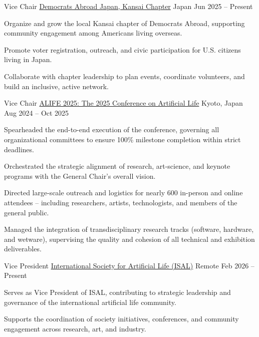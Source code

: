 
\begin{cventries}

\cventry
  {Vice Chair}
  {\href{https://www.democratsabroad.org/jp_kansai}{Democrats Abroad Japan, Kansai Chapter}}
  {Japan}
  {Jun 2025 -- Present}
  {
    \begin{cvitems}
      \item {Organize and grow the local Kansai chapter of Democrats Abroad, supporting community engagement among Americans living overseas.}
      \item {Promote voter registration, outreach, and civic participation for U.S. citizens living in Japan.}
      \item {Collaborate with chapter leadership to plan events, coordinate volunteers, and build an inclusive, active network.}
    \end{cvitems}
  }

\cventry
  {Vice Chair}
  {\href{https://2025.alife.org/}{ALIFE 2025: The 2025 Conference on Artificial Life}}
  {Kyoto, Japan}
  {Aug 2024 -- Oct 2025}
  {
    \begin{cvitems}
        \item {Spearheaded the end-to-end execution of the conference, governing all organizational committees to ensure 100\% milestone completion within strict deadlines.}
        \item {Orchestrated the strategic alignment of research, art-science, and keynote programs with the General Chair's overall vision.}
        \item {Directed large-scale outreach and logistics for nearly 600 in-person and online attendees -- including researchers, artists, technologists, and members of the general public.}
        \item {Managed the integration of transdisciplinary research tracks (software, hardware, and wetware), supervising the quality and cohesion of all technical and exhibition deliverables.}
    \end{cvitems}
  }

\cventry
  {Vice President}
  {\href{https://alife.org/}{International Society for Artificial Life (ISAL)}}
  {Remote}
  {Feb 2026 -- Present}
  {
    \begin{cvitems}
      \item {Serves as Vice President of ISAL, contributing to strategic leadership and governance of the international artificial life community.}
      \item {Supports the coordination of society initiatives, conferences, and community engagement across research, art, and industry.}
    \end{cvitems}
  }


\end{cventries}
